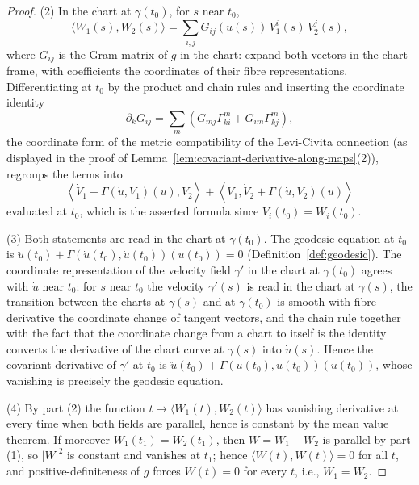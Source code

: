 \begin{proof}
(2) In the chart at $\gamma(t_0)$, for $s$ near $t_0$,
$$\langle W_1(s),W_2(s)\rangle
=\sum_{i,j}G_{ij}(u(s))\,V_1^i(s)\,V_2^j(s),$$
where $G_{ij}$ is the Gram matrix of $g$ in the chart: expand both vectors
in the chart frame, with coefficients the coordinates of their fibre
representations. Differentiating at $t_0$ by the product and chain rules
and inserting the coordinate identity
$$\partial_kG_{ij}
=\sum_m\left(G_{mj}\Gamma^m_{ki}+G_{im}\Gamma^m_{kj}\right),$$
the coordinate form of the metric compatibility of the Levi-Civita
connection (as displayed in the proof of
Lemma~\ref{lem:covariant-derivative-along-maps}(2)), regroups the terms
into
$$\left\langle\dot V_1+\Gamma(\dot u,V_1)(u),V_2\right\rangle
+\left\langle V_1,\dot V_2+\Gamma(\dot u,V_2)(u)\right\rangle$$
evaluated at $t_0$, which is the asserted formula since
$V_i(t_0)=W_i(t_0)$.

(3) Both statements are read in the chart at $\gamma(t_0)$. The geodesic
equation at $t_0$ is $\ddot u(t_0)+\Gamma(\dot u(t_0),\dot
u(t_0))(u(t_0))=0$ (Definition~\ref{def:geodesic}). The coordinate
representation of the velocity field $\gamma'$ in the chart at
$\gamma(t_0)$ agrees with $\dot u$ near $t_0$: for $s$ near $t_0$ the
velocity $\gamma'(s)$ is read in the chart at $\gamma(s)$, the transition
between the charts at $\gamma(s)$ and at $\gamma(t_0)$ is smooth with
fibre derivative the coordinate change of tangent vectors, and the chain
rule together with the fact that the coordinate change from a chart to
itself is the identity converts the derivative of the chart curve at
$\gamma(s)$ into $\dot u(s)$. Hence the covariant derivative of $\gamma'$
at $t_0$ is $\ddot u(t_0)+\Gamma(\dot u(t_0),\dot u(t_0))(u(t_0))$, whose
vanishing is precisely the geodesic equation.

(4) By part (2) the function $t\mapsto\langle W_1(t),W_2(t)\rangle$ has
vanishing derivative at every time when both fields are parallel, hence is
constant by the mean value theorem. If moreover $W_1(t_1)=W_2(t_1)$, then
$W=W_1-W_2$ is parallel by part (1), so $|W|^2$ is constant and vanishes at
$t_1$; hence $\langle W(t),W(t)\rangle=0$ for all $t$, and
positive-definiteness of $g$ forces $W(t)=0$ for every $t$, i.e.,
$W_1=W_2$.
\end{proof}



